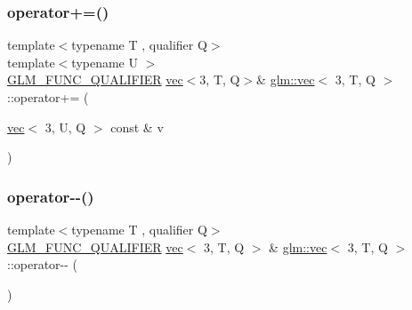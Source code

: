 \subsubsection{\texorpdfstring{operator+=()}{operator+=()}\hspace{0.1cm}{\footnotesize\ttfamily [6/6]}}
{\footnotesize\ttfamily template$<$typename T , qualifier Q$>$ \\
template$<$typename U $>$ \\
\mbox{\hyperlink{setup_8hpp_a33fdea6f91c5f834105f7415e2a64407}{G\+L\+M\+\_\+\+F\+U\+N\+C\+\_\+\+Q\+U\+A\+L\+I\+F\+I\+ER}} \mbox{\hyperlink{structglm_1_1vec}{vec}}$<$3, T, Q$>$\& \mbox{\hyperlink{structglm_1_1vec}{glm\+::vec}}$<$ 3, T, Q $>$\+::operator+= (\begin{DoxyParamCaption}\item[{\mbox{\hyperlink{structglm_1_1vec}{vec}}$<$ 3, U, Q $>$ const \&}]{v }\end{DoxyParamCaption})}

\mbox{\label{structglm_1_1vec_3_013_00_01_t_00_01_q_01_4_a7a914447d1121cc6aa1641280f397d95}} 
\subsubsection{\texorpdfstring{operator-\/-\/()}{operator--()}\hspace{0.1cm}{\footnotesize\ttfamily [1/2]}}
{\footnotesize\ttfamily template$<$typename T , qualifier Q$>$ \\
\mbox{\hyperlink{setup_8hpp_a33fdea6f91c5f834105f7415e2a64407}{G\+L\+M\+\_\+\+F\+U\+N\+C\+\_\+\+Q\+U\+A\+L\+I\+F\+I\+ER}} \mbox{\hyperlink{structglm_1_1vec}{vec}}$<$ 3, T, Q $>$ \& \mbox{\hyperlink{structglm_1_1vec}{glm\+::vec}}$<$ 3, T, Q $>$\+::operator-\/-\/ (\begin{DoxyParamCaption}{ }\end{DoxyParamCaption})}

\mbox{\label{structglm_1_1vec_3_013_00_01_t_00_01_q_01_4_a1a93cbd62e3ce16b183ec1ba135e7c70}} 
